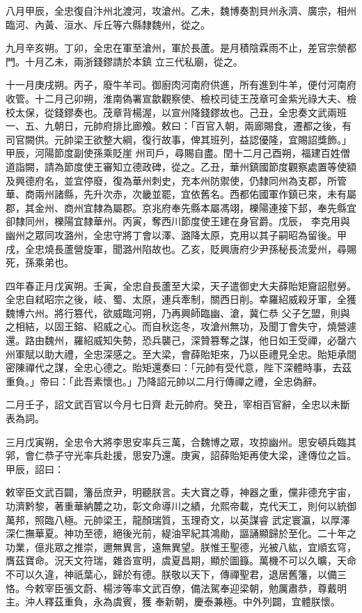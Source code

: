 \begin{pinyinscope}
 八月甲辰，全忠復自汴州北渡河，攻滄州。乙未，魏博奏割貝州永濟、廣宗，相州臨河、內黃、洹水、斥丘等六縣隸魏州，從之。



 九月辛亥朔。丁卯，全忠在軍至滄州，軍於長蘆。是月積陰霖雨不止，差官宗禜都門。十月乙未，兩浙錢鏐請於本鎮
 立三代私廟，從之。



 十一月庚戌朔。丙子，廢牛羊司。御廚肉河南府供進，所有進到牛羊，便付河南府收管。十二月己卯朔，淮南偽署宣歙觀察使、檢校司徒王茂章可金紫光祿大夫、檢校太保，從錢鏐奏也。茂章背楊渥，以宣州降錢鏐故也。己丑，全忠奏文武兩班一、五、九朝日，元帥府排比廊飧。敕曰：「百官入朝，兩廊賜食，遷都之後，有司官闕供。元帥梁王欲整大綱，復行故事，俾其班列，益認優隆，宜賜詔獎飾。」甲辰，河陽節度副使孫乘貶崖
 州司戶，尋賜自盡。閏十二月己酉朔，福建百姓僧道詣闕，請為節度使王審知立德政碑，從之。乙丑，華州鎮國節度觀察處置等使額及興德府名，並宜停廢，復為華州刺史，充本州防禦使，仍隸同州為支郡，所管華、商兩州諸縣，先升次赤，次畿並罷，宜依舊名。西都佑國軍作鎮已來，未有屬郡，其金州、商州宜隸為屬郡。京兆府奉先縣本屬馮翊，櫟陽連接下邽，奉先縣宜卻隸同州，櫟陽宜隸華州。丙寅，奪西川節度使王建在身官爵。戊辰，
 李克用與幽州之眾同攻潞州，全忠守將丁會以澤、潞降太原，克用以其子嗣昭為留後。甲戌，全忠燒長蘆營旋軍，聞潞州陷故也。乙亥，貶興唐府少尹孫秘長流愛州，尋賜死，孫乘弟也。



 四年春正月戊寅朔。壬寅，全忠自長蘆至大梁，天子遣御史大夫薛貽矩齎詔慰勞。全忠自弒昭宗之後，岐、蜀、太原，連兵牽制，關西日削。幸羅紹威殺牙軍，全獲魏博六州。將行篡代，欲威臨河朔，乃再興師臨幽、滄，冀仁恭
 父子乞盟，則與之相結，以固王鎔、紹威之心。而自秋迄冬，攻滄州無功，及聞丁會失守，燒營遽還。路由魏州，羅紹威知失勢，恐兵襲己，深贊篡奪之謀，他日如王受禪，必罄六州軍賦以助大禮，全忠深感之。至大梁，會薛貽矩來，乃以臣禮見全忠。貽矩承間密陳禪代之謀，全忠心德之。貽矩還奏曰：「元帥有受代意，陛下深體時事，去茲重負。」帝曰：「此吾素懷也。」乃降詔元帥以二月行傳禪之禮，全忠偽辭。



 二月壬子，詔文武百官以今月七日齊
 赴元帥府。癸丑，宰相百官辭，全忠以未斷表為詞。



 三月戊寅朔，全忠令大將李思安率兵三萬，合魏博之眾，攻掠幽州。思安頓兵臨其郛，會仁恭子守光率兵赴援，思安乃還。庚寅，詔薛貽矩再使大梁，達傳位之旨。甲辰，詔曰：



 敕宰臣文武百闢，籓岳庶尹，明聽朕言。夫大寶之尊，神器之重，儻非德充宇宙，功濟黔黎，著重華納麓之功，彰文命導川之績，允熙帝載，克代天工，則何以統御萬邦，照臨八極。元帥梁王，龍顏瑞質，玉理奇文，以英謀睿
 武定寰瀛，以厚澤深仁撫華夏。神功至德，絕後光前，緹油罕紀其鴻勛，謳誦顯歸於至化。二十年之功業，億兆眾之推崇，邇無異言，遠無異望。朕惟王聖德，光被八紘，宜順玄穹，膺茲寶命。況天文符瑞，雜沓宣明，虞夏昌期，顯於圖籙。萬機不可以久曠，天命不可以久違，神祇葉心，歸於有德。朕敬以天下，傳禪聖君，退居舊籓，以備三恪。今敕宰臣張文蔚、楊涉等率文武百僚，備法駕奉迎梁朝，勉厲肅恭，尊戴明主。沖人釋茲重負，永為虞賓，獲
 奉新朝，慶泰兼極。中外列闢，宜體朕懷。




\end{pinyinscope}
